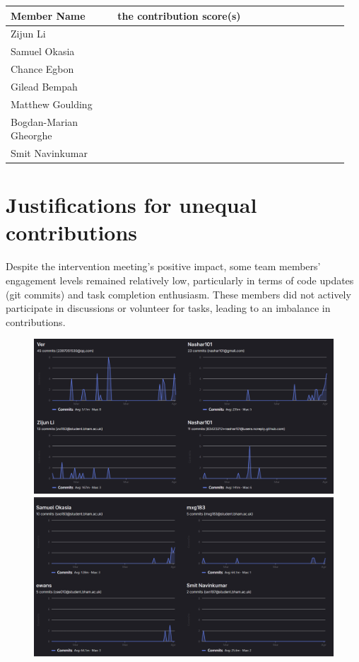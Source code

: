 \documentclass[a4paper]{article}
\begin{document}
{\noindent\begin{tabular}{|p{0.3\linewidth}|p{0.65\linewidth}|} 
	\hline
 \textbf{Member Name} & \textbf{ the contribution score(s) } \\
 \hline
 Zijun Li & \\
 \hline
 Samuel Okasia & \\
 \hline
 Chance Egbon & \\
 \hline
 Gilead Bempah & \\
 \hline
 Matthew Goulding& \\
 \hline
 Bogdan-Marian Gheorghe & \\
 \hline
 Smit Navinkumar& \\
 \hline
\end{tabular}}

\section*{Justifications for unequal contributions}

Despite the intervention meeting's positive impact, some team members' engagement levels remained relatively low, particularly in terms of code updates (git commits) and task completion enthusiasm. These members did not actively participate in discussions or volunteer for tasks, leading to an imbalance in contributions. 

\begin{figure}[H]
    \centering
    \begin{minipage}{0.49\textwidth}
      \centering
      \includegraphics[width=\linewidth]{./image/Contributor_1.png}
    \end{minipage}\hfill
    \begin{minipage}{0.49\textwidth}
      \centering
      \includegraphics[width=\linewidth]{./image/Contributor_2.png}
    \end{minipage}
\end{figure}
\end{document}
